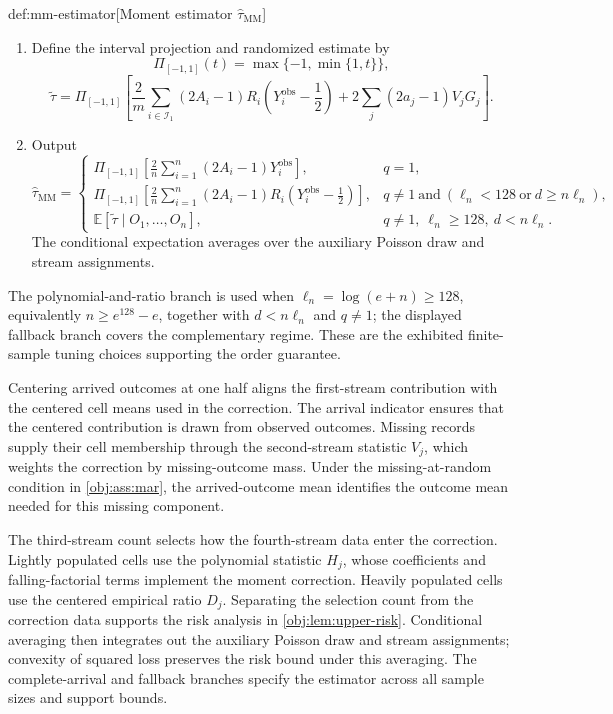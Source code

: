 \documentclass[11pt]{article}
\begin{document}
\begin{algorithmv}{def:mm-estimator}[Moment estimator $\widehat\tau_{\mathrm{MM}}$]
\begin{enumerate}
\item Define the interval projection and randomized estimate by
\[
\Pi_{[-1,1]}(t)=\max\{-1,\min\{1,t\}\},
\]
\[
\widetilde\tau
=\Pi_{[-1,1]}\!\left[
\frac2m\sum_{i\in\mathcal I_1}(2A_i-1)R_i
\left(Y_i^{\mathrm{obs}}-\frac12\right)
+2\sum_j(2a_j-1)V_jG_j
\right].
\]

\item Output
\[
\widehat\tau_{\mathrm{MM}}
=
\begin{cases}
\displaystyle
\Pi_{[-1,1]}\!\left[
\frac2n\sum_{i=1}^n(2A_i-1)Y_i^{\mathrm{obs}}
\right],
&q=1,\\[8pt]
\displaystyle
\Pi_{[-1,1]}\!\left[
\frac2n\sum_{i=1}^n(2A_i-1)R_i
\left(Y_i^{\mathrm{obs}}-\frac12\right)
\right],
&q\ne1\ \text{and}\ (\ell_n<128\ \text{or}\ d\ge n\ell_n),\\[8pt]
\displaystyle
\mathbb E[\widetilde\tau\mid O_1,\ldots,O_n],
&q\ne1,\ \ell_n\ge128,\ d<n\ell_n.
\end{cases}
\]
The conditional expectation averages over the auxiliary Poisson draw and stream assignments.
\end{enumerate}
\end{algorithmv}

The polynomial-and-ratio branch is used when \(\ell_n=\log(e+n)\ge128\), equivalently \(n\ge e^{128}-e\), together with \(d<n\ell_n\) and \(q\ne1\); the displayed fallback branch covers the complementary regime. These are the exhibited finite-sample tuning choices supporting the order guarantee.

Centering arrived outcomes at one half aligns the first-stream contribution with the centered cell means used in the correction. The arrival indicator ensures that the centered contribution is drawn from observed outcomes. Missing records supply their cell membership through the second-stream statistic \(V_j\), which weights the correction by missing-outcome mass. Under the missing-at-random condition in \cref{obj:ass:mar}, the arrived-outcome mean identifies the outcome mean needed for this missing component.

The third-stream count selects how the fourth-stream data enter the correction. Lightly populated cells use the polynomial statistic \(H_j\), whose coefficients and falling-factorial terms implement the moment correction. Heavily populated cells use the centered empirical ratio \(D_j\). Separating the selection count from the correction data supports the risk analysis in \cref{obj:lem:upper-risk}. Conditional averaging then integrates out the auxiliary Poisson draw and stream assignments; convexity of squared loss preserves the risk bound under this averaging. The complete-arrival and fallback branches specify the estimator across all sample sizes and support bounds.
\end{document}
